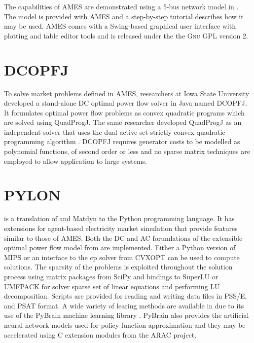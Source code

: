 The capabilities of AMES are demonstrated using a 5-bus network model in
.  The model is provided with AMES and a step-by-step
tutorial describes how it may be used.  AMES comes with a
Swing-based graphical user interface with plotting and table editor tools and
is released under the the \textsc{Gnu} GPL version 2.

\section{DCOPFJ}
\label{sec:dcopfj}
To solve market problems defined in AMES, researchers at Iowa State University
developed a stand-alone DC optimal power flow solver in Java named DCOPFJ.
It formulates optimal power flow problems as convex quadratic programs
which are solved using QuadProgJ.  The same researcher developed QuadProgJ as
an independent solver that uses the dual active set strictly convex quadratic
programming algorithm \cite{goldfarb:scqp}.  DCOPFJ requires
generator costs to be modelled as polynomial functions, of second order or
less and no sparse matrix techniques are employed to allow application to large
systems.

\section{PYLON}

\pylon is a translation of \matpower and Matdyn to the Python programming
language.  It has extensions for agent-based electricity market simulation
that provide features similar to those of AMES.  Both the DC and AC
forumlations of the extensible optimal power flow model \cite{zimmerman:mp_pes}
from \matpower are implemented.  Either a Python version of MIPS or an
interface to the cp solver from CVXOPT can be used to compute solutions.  The
sparsity of the problems is exploited throughout the solution process using
matrix packages from SciPy and bindings to SuperLU or UMFPACK for solver sparse
set of linear equations and performing LU decomposition.  Scripts are provided
for reading and writing data files in PSS/E, \matpower and PSAT format. A wide
variety of learing methods are available in \pylon due to its use of the
PyBrain machine learning library \cite{schaul:2010}.  PyBrain also provides
the artificial neural network models used for policy function approximation
and they may be accelerated using C extension modules from the ARAC project.

